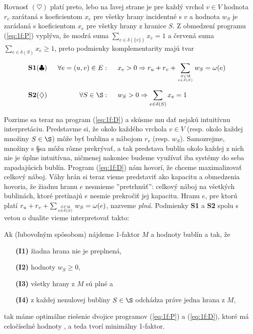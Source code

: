 \noindent
Rovnosť $(\heartsuit)$ platí preto, lebo na ľavej strane je
pre každý vrchol $v\in V$ hodnota $r_v$ zarátaná s koeficientom $x_e$
pre všetky hrany incidentné s $v$ a hodnota $w_S$ je zarádaná s koeficientom $x_e$ pre všetky hrany z hranice $S$.
Z obmedzení programu (\ref{eq:1f:P}) vyplýva, že modrá suma $\sum_{e\in\delta(\{v\})}x_e=1$ a
červená suma $\sum_{e\in\delta(S)}x_e\ge1$, preto podmienky komplementarity majú tvar

$$\begin{array}{lrl}
  {\bf S1} (\clubsuit) \;\;&\forall e=(u,v)\in E:\;\;&x_e>0\Rightarrow r_u + r_v +
  \displaystyle\sum\limits_{S\in\S\atop e\in\delta(S)}w_S=\omega(e)\\[6ex]
  {\bf S2} (\diamondsuit)\;\;&\forall S\in\S:\;\; & w_S>0\Rightarrow \displaystyle\sum\limits_{e\in\delta(S)}x_e=1
\end{array}$$


\noindent
Pozrime sa teraz na program (\ref{eq:1f:D}) a skúsme mu dať nejakú intuitívnu interpretáciu.
Predstavme si, že okolo každého vrchola $v\in V$ (resp. okolo každej  množiny $S\in\S$) 
môže byť bublina s nábojom $r_v$ (resp. $w_S$). Samozrejme, množiny s \S sa môžu rôzne prekrývať,
a tak predstava bublín okolo každej z nich nie je úplne intuitívna, ničmenej nakoniec budeme
využívať iba systémy do seba zapadajúcich bublín. Program (\ref{eq:1f:D}) nám hovorí,
že chceme maximalizovať celkový náboj. Váhy hrán si teraz vieme predstaviť ako kapacitu a obmedzenia
hovoria, že žiadnu hranu $e$ nesmieme ''pretrhnúť'': celkový náboj na všetkých bublinách, ktoré pretínajú
$e$ nesmie prekročiť jej kapacitu. 
Hranu $e$, pre ktorú platí $ r_u + r_v + \sum_{S\in\S\atop e\in\delta(S)}w_S=\omega(e)$, nazveme {\em plná}.
Podmienky {\bf S1} a {\bf S2} spolu s vetou o dualite vieme interpretovať takto:

\begin{lema}
  \label{lm:1f:opt}
  Ak (ľubovoľným spôsobom) nájdeme 1-faktor $M$ a hodnoty bublín  a  tak, že
  \begin{itemize}
    \item[{\bf (I1)}] žiadna hrana nie je preplnená,
    \item[{\bf (I2)}] hodnoty $w_S\ge 0$,
    \item[{\bf (I3)}] všetky hrany z $M$ sú plné  a
    \item[{\bf (I4)}]  z každej nenulovej bubliny $S\in\S$ odchádza práve jedna hrana z $M$,
\end{itemize}
  tak máme optimálne riešenie dvojice programov (\ref{eq:1f:P}) a (\ref{eq:1f:D}), ktoré má celočíselné
  hodnoty , a teda tvorí minimálny 1-faktor.
\end{lema}

